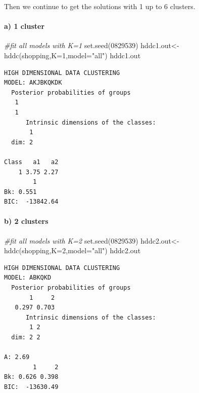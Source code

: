 \documentclass[
  11pt,
]{article}
\newenvironment{Shaded}{\begin{snugshade}}{\end{snugshade}}
\newcommand{\AttributeTok}[1]{\textcolor[rgb]{0.77,0.63,0.00}{#1}}
\newcommand{\CommentTok}[1]{\textcolor[rgb]{0.56,0.35,0.01}{\textit{#1}}}
\newcommand{\DecValTok}[1]{\textcolor[rgb]{0.00,0.00,0.81}{#1}}
\newcommand{\FunctionTok}[1]{\textcolor[rgb]{0.00,0.00,0.00}{#1}}
\newcommand{\NormalTok}[1]{#1}
\newcommand{\OtherTok}[1]{\textcolor[rgb]{0.56,0.35,0.01}{#1}}
\newcommand{\StringTok}[1]{\textcolor[rgb]{0.31,0.60,0.02}{#1}}
\begin{document}
Then we continue to get the solutions with 1 up to 6 clusters.

\hypertarget{a-1-cluster-1}{%
\paragraph{a) 1 cluster}\label{a-1-cluster-1}}

\begin{Shaded}
\begin{Highlighting}[]
\CommentTok{\#fit all models with K=1}
\FunctionTok{set.seed}\NormalTok{(}\DecValTok{0829539}\NormalTok{)}
\NormalTok{hddc1.out}\OtherTok{\textless{}{-}}\FunctionTok{hddc}\NormalTok{(shopping,}\AttributeTok{K=}\DecValTok{1}\NormalTok{,}\AttributeTok{model=}\StringTok{"all"}\NormalTok{)}
\NormalTok{hddc1.out}
\end{Highlighting}
\end{Shaded}

\begin{verbatim}
HIGH DIMENSIONAL DATA CLUSTERING
MODEL: AKJBKQKDK
  Posterior probabilities of groups
   1
   1
      Intrinsic dimensions of the classes:
       1
  dim: 2
     
Class   a1   a2
    1 3.75 2.27
        1
Bk: 0.551
BIC:  -13842.64 
\end{verbatim}

\hypertarget{b-2-clusters}{%
\paragraph{b) 2 clusters}\label{b-2-clusters}}

\begin{Shaded}
\begin{Highlighting}[]
\CommentTok{\#fit all models with K=2}
\FunctionTok{set.seed}\NormalTok{(}\DecValTok{0829539}\NormalTok{)}
\NormalTok{hddc2.out}\OtherTok{\textless{}{-}}\FunctionTok{hddc}\NormalTok{(shopping,}\AttributeTok{K=}\DecValTok{2}\NormalTok{,}\AttributeTok{model=}\StringTok{"all"}\NormalTok{)}
\NormalTok{hddc2.out}
\end{Highlighting}
\end{Shaded}

\begin{verbatim}
HIGH DIMENSIONAL DATA CLUSTERING
MODEL: ABKQKD
  Posterior probabilities of groups
       1     2
   0.297 0.703
      Intrinsic dimensions of the classes:
       1 2
  dim: 2 2
       
A: 2.69
        1     2
Bk: 0.626 0.398
BIC:  -13630.49 
\end{verbatim}
\end{document}
